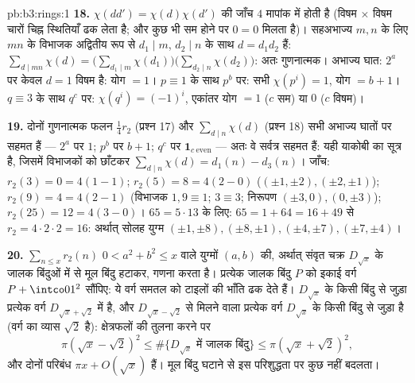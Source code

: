 \begin{solution}{pb:b3:rings:1}
\textbf{18.} $\chi(dd') = \chi(d)\chi(d')$ की जाँच $4$ मापांक में होती है (विषम $\times$
विषम चारों चिह्न स्थितियाँ ढक लेता है; और कुछ भी सम होने पर $0 = 0$
मिलता है)। सहअभाज्य $m, n$ के लिए $mn$ के विभाजक अद्वितीय रूप से
$d_1 \mid m$, $d_2 \mid n$ के साथ $d = d_1d_2$ हैं: $\sum_{d \mid mn}\chi(d) = \bigl(\sum_{d_1\mid
m}\chi(d_1)\bigr)\bigl(\sum_{d_2\mid n}\chi(d_2)\bigr)$: अतः गुणनात्मक। अभाज्य घात:
$2^a$ पर केवल $d = 1$ विषम है: योग $= 1$। $p \equiv 1$ के साथ $p^b$ पर: सभी
$\chi(p^i) = 1$, योग $= b + 1$। $q \equiv 3$ के साथ $q^c$ पर: $\chi(q^i) =
(-1)^i$, एकांतर योग $= 1$
($c$ सम) या $0$ ($c$ विषम)।

\textbf{19.} दोनों गुणनात्मक फलन $\frac14r_2$ (प्रश्न 17) और $\sum_{d\mid n}\chi(d)$ (प्रश्न
18) सभी अभाज्य घातों पर सहमत हैं --- $2^a$ पर $1$; $p^b$ पर $b + 1$;
$q^c$ पर $\mathbf 1_{c\ \mathrm{even}}$ --- अतः वे सर्वत्र सहमत हैं: यही याकोबी का सूत्र है,
जिसमें विभाजकों को छाँटकर $\sum_{d\mid
n}\chi(d) = d_1(n) - d_3(n)$। जाँच: $r_2(3) = 0 = 4(1 - 1)$; $r_2(5) = 8 = 4(2 - 0)$ ($(\pm1,\pm2), (\pm2,\pm1)$); $r_2(9) = 4 = 4(2 - 1)$
(विभाजक $1, 9 \equiv 1$; $3 \equiv 3$; निरूपण $(\pm3, 0), (0, \pm3)$); $r_2(25) = 12 = 4(3 - 0)$। $65 =
5\cdot13$ के लिए: $65 = 1 + 64 = 16
+ 49$ से
$r_2 = 4\cdot2\cdot2 = 16$: अर्थात् सोलह युग्म $(\pm1, \pm8), (\pm8, \pm1), (\pm4,
\pm7), (\pm7, \pm4)$।

\textbf{20.} $\sum_{n \leq x}r_2(n)$ $0 < a^2 + b^2 \leq x$ वाले युग्मों $(a, b)$ की, अर्थात् संवृत चक्र
$D_{\sqrt x}$ के जालक बिंदुओं में से मूल बिंदु हटाकर, गणना करता है। प्रत्येक
जालक बिंदु $P$ को इकाई वर्ग $P + \intco01^2$ सौंपिए: ये वर्ग समतल को टाइलों
की भाँति ढक देते हैं। $D_{\sqrt x}$ के किसी बिंदु से जुड़ा प्रत्येक वर्ग
$D_{\sqrt x + \sqrt2}$ में है, और $D_{\sqrt x - \sqrt 2}$ से मिलने वाला प्रत्येक वर्ग $D_{\sqrt x}$ के किसी
बिंदु से जुड़ा है (वर्ग का व्यास $\sqrt 2$ है): क्षेत्रफलों की तुलना
करने पर
\[
\pi(\sqrt x - \sqrt2)^2 \leq \#\{
D_{\sqrt x} \text{ में जालक बिंदु}\} \leq \pi(\sqrt x + \sqrt 2)^2,
\]
और दोनों परिबंध $\pi x + O(\sqrt x)$ हैं। मूल बिंदु घटाने से इस परिशुद्धता पर कुछ
नहीं बदलता।


\end{solution}
